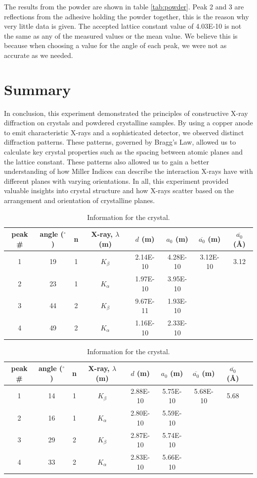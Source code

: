 \documentclass[a4paper,12pt,english]{all-in-one} %
\begin{document}
\begin{multicols}{2}
{The results from the  powder are shown in table \ref{tab:powder}. Peak 2 and 3 are reflections from the adhesive holding the powder together, this is the reason why very little data is given. The accepted lattice constant value of 4.03E-10 is not the same as any of the measured values or the mean value. We believe this is because when choosing a value for the angle of each peak, we were not as accurate as we needed. 
}


\end{multicols}

\section*{Summary}
{
In conclusion, this experiment demonstrated the principles of constructive X-ray diffraction on crystals and powdered crystalline samples. By using a copper anode to emit characteristic X-rays and a sophisticated detector, we observed distinct diffraction patterns. These patterns, governed by Bragg’s Law, allowed us to calculate key crystal properties such as the spacing between atomic planes and the lattice constant. These patterns also allowed us to gain a better understanding of how Miller Indices can describe the interaction X-rays have with different planes with varying orientations. In all, this experiment provided valuable insights into crystal structure and how X-rays scatter based on the arrangement and orientation of crystalline planes.
}

\begin{table}[]
\centering
\begin{tabular}{c|c|c|c|c|c|c|c}
peak \# & angle ($^\circ$) & n & X-ray, $\lambda$ (m) & $d$ (m) & $a_0$ (m) & $\overline{a_0}$ (m) & $\overline{a_0}$ (\AA) \\ \hline
1 & 19 & 1 & $K_\beta$ & 2.14E-10 & 4.28E-10  & 3.12E-10 & 3.12\\
2 & 23 & 1 & $K_\alpha$ & 1.97E-10 & 3.95E-10 \\
3 & 44 & 2 & $K_\beta$ & 9.67E-11	& 1.93E-10\\
4 & 49 & 2 & $K_\alpha$ & 1.16E-10 & 2.33E-10 \\   
\end{tabular}
\caption{Information for the  crystal.}
\label{tab:LiF}
\end{table}

\begin{table}[]
\centering
\begin{tabular}{c|c|c|c|c|c|c|c|c}
peak \# & angle ($^\circ$) & n & X-ray, $\lambda$ (m) & $d$ (m) & $a_0$ (m) & $\overline{a_0}$ (m) & $\overline{a_0}$ (\AA) \\ \hline
1 & 14 & 1 & $K_\beta$ & 2.88E-10 & 5.75E-10 & 5.68E-10 & 5.68 \\
2 & 16 & 1 & $K_\alpha$ & 2.80E-10 & 5.59E-10 \\
3 & 29 & 2 & $K_\beta$ & 2.87E-10 & 5.74E-10\\
4 & 33 & 2 & $K_\alpha$ & 2.83E-10 & 5.66E-10 \\  
\end{tabular}
\caption{Information for the  crystal.}
\label{tab:NaCl}
\end{table}
\end{document}
